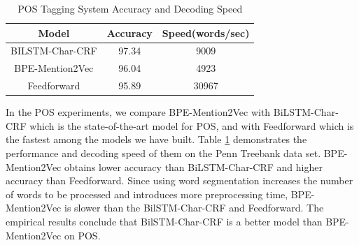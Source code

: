 \begin{table}[]
\centering
\caption{POS Tagging System Accuracy and Decoding Speed}
\label{table:pos-mention2vec}
\begin{tabular}{|c|c|c|}
\hline
Model   & Accuracy     & Speed(words/sec) \\ \hline
BILSTM-Char-CRF & 97.34  & 9009    \\ \hline
BPE-Mention2Vec & 96.04  & 4923    \\ \hline
Feedforward     & 95.89  & 30967   \\ \hline
\end{tabular}
\end{table}

In the POS experiments, we compare BPE-Mention2Vec with BiLSTM-Char-CRF which is the state-of-the-art model for POS, and with Feedforward which is the fastest among the models we have built. Table \ref{table:pos-mention2vec} demonstrates the performance and decoding speed of them on the Penn Treebank data set. BPE-Mention2Vec obtains lower accuracy than BiLSTM-Char-CRF and higher accuracy than Feedforward. Since using word segmentation increases the number of words to be processed and introduces more preprocessing time, BPE-Mention2Vec is slower than the BilSTM-Char-CRF and Feedforward. The empirical results conclude that BilSTM-Char-CRF is a better model than BPE-Mention2Vec on POS. 
